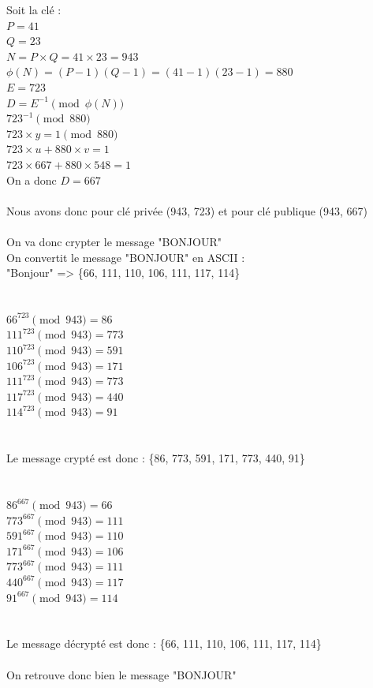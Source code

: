 \documentclass[12pt,a4paper]{report}
\begin{document}
\begin{itemize}
Soit la clé :\\
$P=41$\\
$Q=23$\\
$N=P \times Q = 41 \times 23 = 943$\\
$\phi (N) = (P-1)(Q-1) = (41-1)(23-1) = 880$\\
$E=723$\\
$D=E^{-1} \pmod{\phi (N)}$\\
$723^{-1} \pmod{880}$\\
$723 \times y = 1 \pmod{880}$\\
$723 \times u + 880 \times v = 1$\\
$723 \times 667 + 880 \times 548 = 1$\\
On a donc $D=667$\\
\\
Nous avons donc pour clé privée (943, 723) et pour clé publique (943, 667)
\\
\\
On va donc crypter le message "BONJOUR"\\
On convertit le message "BONJOUR" en ASCII :\\
"Bonjour" => \{66, 111, 110, 106, 111, 117, 114\}\\
\\
\\
$66^{723} \pmod{943} = 86$\\
$111^{723} \pmod{943} = 773$\\
$110^{723} \pmod{943} = 591$\\
$106^{723} \pmod{943} = 171$\\
$111^{723} \pmod{943} = 773$\\
$117^{723} \pmod{943} = 440$\\
$114^{723} \pmod{943} = 91$\\
\\
\\
Le message crypté est donc : \{86, 773, 591, 171, 773, 440, 91\}\\
\\
\\
$86^{667} \pmod{943} = 66$\\
$773^{667} \pmod{943} = 111$\\
$591^{667} \pmod{943} = 110$\\
$171^{667} \pmod{943} = 106$\\
$773^{667} \pmod{943} = 111$\\
$440^{667} \pmod{943} = 117$\\
$91^{667} \pmod{943} = 114$\\
\\
\\
Le message décrypté est donc : \{66, 111, 110, 106, 111, 117, 114\}\\
\\
On retrouve donc bien le message "BONJOUR"\\


\end{itemize}
\end{document}
